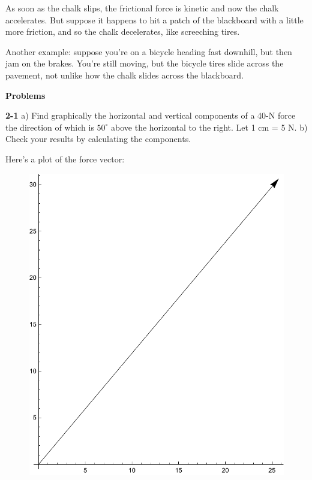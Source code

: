 \documentclass{amsart}
\begin{document}
As soon as the chalk slips, the frictional force is kinetic and now the chalk accelerates.
But suppose it happens to hit a patch of the blackboard with a little more friction,
and so the chalk decelerates, like screeching tires.

Another example: suppose you're on a bicycle heading fast downhill, but then jam on the brakes.
You're still moving, but the bicycle tires slide across the pavement, not unlike how the chalk slides across the blackboard.

\vspace{\baselineskip}

\textbf{Problems}

\vspace{\baselineskip}

\noindent
\textbf{2-1} \newline
a) Find graphically the horizontal and vertical components of a 40-N force the direction
of which is $50^\circ$ above the horizontal to the right.  Let 1 cm = 5 N. \newline
b) Check your results by calculating the components.

Here's a plot of the force vector:

\begin{figure}[h]
\includegraphics[scale=0.3]{2-1}
\end{figure}
\end{document}

